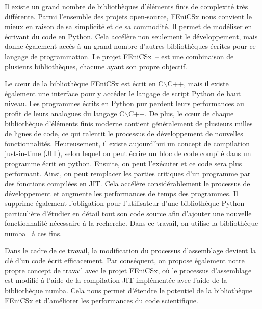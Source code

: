 \documentclass[12pt]{article}
\begin{document}
Il existe un grand nombre de bibliothèques d'éléments finis de complexité très différente. Parmi l'ensemble des projets open-source, FEniCSx nous convient le mieux en raison de sa simplicité et de sa commodité. Il permet de modéliser en écrivant du code en Python. Cela accélère non seulement le développement, mais donne également accès à un grand nombre d'autres bibliothèques écrites pour ce langage de programmation. Le projet FEniCSx~\parencite{FEniCS2015}--\parencite{LoggEtal2012} est une combinaison de plusieurs bibliothèques, chacune ayant son propre objectif. 


Le cœur de la bibliothèque FEniCSx est écrit en C$\backslash$C++, mais il existe également une interface pour y accéder le langage de script Python de haut niveau. Les programmes écrits en Python pur perdent leurs performances au profit de leurs analogues du langage C$\backslash$C++. De plus, le cœur de chaque bibliothèque d'éléments finis moderne contient généralement de plusieurs milles de lignes de code, ce qui ralentit le processus de développement de nouvelles fonctionnalités. Heureusement, il existe aujourd'hui un concept de compilation just-in-time (JIT), selon lequel on peut écrire un bloc de code compilé dans un programme écrit en python. Ensuite, on peut l'exécuter et ce code sera plus performant. Ainsi, on peut remplacer les parties critiques d'un programme par des fonctions compilées en JIT. Cela accélère considérablement le processus de développement et augmente les performances de temps des programmes. Il supprime également l'obligation pour l'utilisateur d'une bibliothèque Python particulière d'étudier en détail tout son code source afin d'ajouter une nouvelle fonctionnalité nécessaire à la recherche. Dans ce travail, on utilise la bibliothèque numba~\parencite{Numba2015} à ces fins. 

Dans le cadre de ce travail, la modification du processus d'assemblage devient la clé d'un code écrit efficacement. Par conséquent, on propose également notre propre concept de travail avec le projet FEniCSx, où le processus d'assemblage est modifié à l'aide de la compilation JIT implémentée avec l'aide de la bibliothèque numba. Cela nous permet d'étendre le potentiel de la bibliothèque FEniCSx et d'améliorer les performances du code scientifique.
\end{document}
